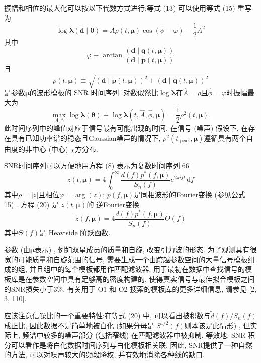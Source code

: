 \documentclass[a4paper]{\documentclassname}
\def\b{\boldsymbol}
\def\d{\mathrm{d}}
\def\t{\text}
\def\ti{\tilde}
\theoremstyle{definition}
\begin{document}
振幅和相位的最大化可以按以下代数方式进行:等式  (13)  可以使用等式  (15)  重写为
\begin{equation}
    \log\b{\lambda}(\b{d}\mid\b{\theta})=A\rho(t,\b{\mu})\cos(\phi-\varphi)-\frac{1}{2}A^2
\end{equation}
其中
\begin{equation}
    \varphi\equiv\arctan\frac{(\b{d}\mid\b{q}(t,\b{\mu}))}{(\b{d}\mid\b{p}(t,\b{\mu}))}
\end{equation}
且
\begin{equation}
    \rho(t,\b{\mu})\equiv\sqrt{(\b{d}\mid\b{p}(t,\b{\mu}))^2+(\b{d}\mid\b{q}(t,\b{\mu}))^2}
\end{equation}
是参数$\b{\mu}$的波形模板的 SNR 时间序列. 对数似然比$\log\b{\lambda}$在$\hat{A} = \rho$且$\hat{\phi} = \varphi$时振幅最大为
\begin{equation}
    \max_{A,\phi}\log\b{\lambda}(\b{\theta})\equiv\log\b{\lambda}(t,\hat{A},\hat{\phi},\b{\mu})=\frac{1}{2}\rho^2(t,\b{\mu}).
\end{equation}
此时间序列中的峰值对应于信号最有可能出现的时间. 在信号 (噪声) 假设下, 在存在具有已知功率谱的稳态且Gaussian噪声的情况下, $\rho^2 (t_{{{\t{ peak}}}}, {\b{\mu}}) $遵循具有两个自由度的非中心 (中心) $\chi$方分布. 

SNR时间序列可以方便地用方程 (8) 表示为复数时间序列[66]
\begin{equation}
    z(t,\b{\mu})=4\int_0^\infty\frac{d(f)p^\ast(f,\b{\mu})}{S_n(f)}e^{2\pi ift}\,\d f
\end{equation}
其中$\rho = |z|$且相位$\varphi = \arg (z) $; $\ti{p} (f, {\b{\mu}}) $是同相波形的Fourier变换 (参见公式 15) . 方程  (20)  是 $z(t,\b{\mu})$的 逆Fourier变换
\begin{equation}
    \ti{z}(f,\b{\mu})=4\frac{d(f)p^\ast(f,\b{\mu})}{S_n(f)}\Theta(f)
\end{equation}
其中$\Theta(f)$是 Heaviside 阶跃函数. 

参数 (由$\b{\mu}$表示) , 例如双星成员的质量和自旋, 改变引力波的形态. 为了观测具有很宽的可能质量和自旋范围的信号, 需要生成一个由跨越参数空间的大量信号模板组成的组, 并且组中的每个模板都用作匹配滤波器. 用于最初在数据中查找信号的模板库是在参数空间中具有足够高的密度构建的, 使得真实信号与最佳拟合模板之间的SNR损失小于3\%{}. 有关用于 O1 和 O2 搜索的模板库的更多详细信息, 请参见 [2,  3,  110]. 

应该注意信噪比的一个重要特性:在等式 (20) 中, 可以看出被积数与$\ti{d} (f) /S_{n} (f) $成正比, 因此数据不是简单地被白化 (如果分母是 $S^{1/2} (f) $则本该是此情形) , 但实际上, 频谱中较多的噪声部分 (包括窄线) 在匹配滤波器中被抑制. 等效地, SNR 积分可以看作是将白化数据时间序列与白化模板相关联. 因此, SNR提供了一种自然的方法, 可以对噪声较大的频段降权, 并有效地消除各种线的缺口. 
\end{document}
